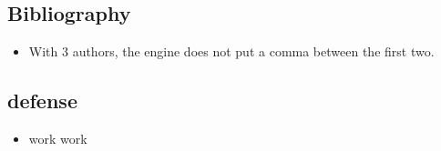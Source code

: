 \documentclass{article}
\begin{document}
\subsection{Bibliography}
\begin{itemize}
    \item With 3 authors, the engine does not put a comma between the first two.
\end{itemize}

\subsection{defense}
\begin{itemize}
    \item work work
\end{itemize}


\end{document}
